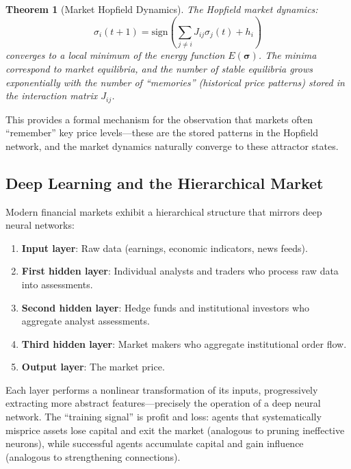 \documentclass[12pt,a4paper]{article}
\newtheorem{theorem}{Theorem}[section]
\theoremstyle{definition}
\begin{document}
\begin{theorem}[Market Hopfield Dynamics]\label{thm:hopfield}
The Hopfield market dynamics:
\begin{equation}
    \sigma_i(t+1) = \text{sign}\left(\sum_{j \neq i} J_{ij} \sigma_j(t) + h_i\right)
\end{equation}
converges to a local minimum of the energy function $E(\boldsymbol{\sigma})$. The minima correspond to market equilibria, and the number of stable equilibria grows exponentially with the number of ``memories'' (historical price patterns) stored in the interaction matrix $J_{ij}$.
\end{theorem}

This provides a formal mechanism for the observation that markets often ``remember'' key price levels---these are the stored patterns in the Hopfield network, and the market dynamics naturally converge to these attractor states.

\subsection{Deep Learning and the Hierarchical Market}

Modern financial markets exhibit a hierarchical structure that mirrors deep neural networks:

\begin{enumerate}[label=(\roman*)]
    \item \textbf{Input layer}: Raw data (earnings, economic indicators, news feeds).
    \item \textbf{First hidden layer}: Individual analysts and traders who process raw data into assessments.
    \item \textbf{Second hidden layer}: Hedge funds and institutional investors who aggregate analyst assessments.
    \item \textbf{Third hidden layer}: Market makers who aggregate institutional order flow.
    \item \textbf{Output layer}: The market price.
\end{enumerate}

Each layer performs a nonlinear transformation of its inputs, progressively extracting more abstract features---precisely the operation of a deep neural network. The ``training signal'' is profit and loss: agents that systematically misprice assets lose capital and exit the market (analogous to pruning ineffective neurons), while successful agents accumulate capital and gain influence (analogous to strengthening connections).
\end{document}
